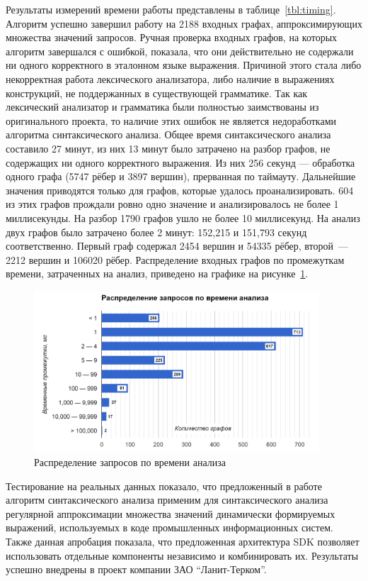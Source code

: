 Результаты измерений времени работы представлены в таблице~\ref{tbl:timing}. Алгоритм успешно завершил работу на 2188 входных графах, аппроксимирующих множества значений запросов. Ручная проверка входных графов, на которых алгоритм завершался с ошибкой, показала, что они действительно не содержали ни одного корректного в эталонном языке выражения. Причиной этого стала либо некорректная работа лексического анализатора, либо наличие в выражениях конструкций, не поддержанных в существующей грамматике. Так как лексический анализатор и грамматика были полностью заимствованы из оригинального проекта, то наличие этих ошибок не является недоработками алгоритма синтаксического анализа. Общее время синтаксического анализа составило 27 минут, из них 13 минут было затрачено на разбор графов, не содержащих ни одного корректного выражения. Из них 256 секунд --- обработка одного графа (5747 рёбер и 3897 вершин), прерванная по таймауту. Дальнейшие значения приводятся только для графов, которые удалось проанализировать. 604 из этих графов прождали ровно одно значение и анализировалось не более 1 миллисекунды. На разбор 1790 графов ушло не более 10 миллисекунд. На анализ двух графов было затрачено более 2 минут: 152,215 и 151,793 секунд соответственно. Первый граф содержал 2454 вершин и 54335 рёбер, второй~--- 2212 вершин и 106020 рёбер. Распределение входных графов по промежуткам времени, затраченных на анализ, приведено на графике на рисунке~\ref{distr}.

\begin{figure}[H]
  \centering
 \includegraphics[width=0.95\textwidth]{pics/distr.png}
 \caption{Распределение запросов по времени анализа}
 \label{distr}
\end{figure}


Тестирование на реальных данных показало, что предложенный в работе алгоритм синтаксического анализа применим для синтаксического анализа регулярной аппроксимации множества значений динамически формируемых выражений, используемых в коде промышленных информационных систем. Также данная апробация показала, что предложенная архитектура SDK позволяет использовать отдельные компоненты независимо и комбинировать их. Результаты успешно внедрены в проект компании ЗАО ``Ланит-Терком''.


